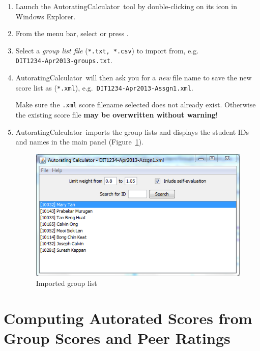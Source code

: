 \documentclass[a4paper,11pt]{refart}
\newcommand\AutoCalc{\textsf{AutoratingCalculator}}
\begin{document}
\begin{enumerate}
\item Launch the \AutoCalc\ tool by double-clicking on its icon in Windows Explorer.
\item From the menu bar, select  or press .
\item Select a \emph{group list file} (\texttt{*.txt, *.csv}) to import from, e.g.\\\texttt{DIT1234-Apr2013-groups.txt}.
\item \AutoCalc\ will then ask you for a \emph{new} file name to save the new score list as (\texttt{*.xml}), e.g.~\texttt{DIT1234-Apr2013-Assgn1.xml}.


\medskip

\begin{leftbar}
Make sure the \texttt{.xml} score filename selected does not already exist. Otherwise the existing score file \textbf{may be overwritten without warning}!
\end{leftbar}

\medskip

\item \AutoCalc\ imports the group lists and displays the student IDs and names in the main panel (Figure~\ref{fig:grouplist}).

\begin{figure}[hbt!]\centering
\includegraphics[width=\textwidth]{grouplist}
\caption{Imported group list}\label{fig:grouplist}
\end{figure}
\end{enumerate}

\section{Computing Autorated Scores from Group Scores and Peer Ratings}
\end{document}
